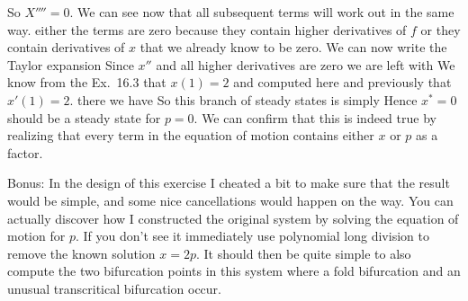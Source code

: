 So $X''''=0$. We can see now that all subsequent terms will work out in the same way. either the terms are zero because they contain higher derivatives of $f$ or they contain derivatives of $x$ that we already know to be zero. We can now write the Taylor expansion
Since $x''$ and all higher derivatives are zero we are left with 
We know from the Ex.~16.3 that $x(1)=2$ and computed here and previously that $x'(1)=2$. there we have 
So this branch of steady states is simply 
Hence $x^*=0$ should be a steady state for $p=0$. We can confirm that this is indeed true by realizing that every term in the equation of motion contains either $x$ or $p$ as a factor. 

Bonus: In the design of this exercise I cheated a bit to make sure that the result would be simple, and some nice cancellations would happen on the way.  You can actually discover how I constructed the original system by solving the equation of motion for $p$. If you don't see it immediately use polynomial long division to remove the known solution $x=2p$. It should then be quite simple to also compute the two bifurcation points in this system where a fold bifurcation and an unusual transcritical bifurcation occur.   





